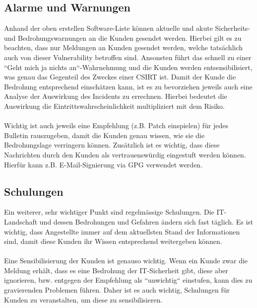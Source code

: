 \subsection{Alarme und Warnungen}
Anhand der oben erstellen Software-Liste können aktuelle und akute Sicherheits- und Bedrohungswarnungen an die Kunden gesendet werden. Hierbei gilt es zu beachten, dass nur Meldungen an Kunden gesendet werden, welche tatsächlich auch von dieser Vulnerability betroffen sind. Ansonsten führt das schnell zu einer ``Geht mich ja nichts an``-Wahrnehmung und die Kunden werden entsensibilisiert, was genau das Gegenteil des Zweckes einer CSIRT ist. Damit der Kunde die Bedrohung entsprechend einschätzen kann, ist es zu bevorziehen jeweils auch eine Analyse der Auswirkung des Incidents zu errechnen. Hierbei bedeutet die Auswirkung die Eintrittswahrscheinlichkeit multipliziert mit dem Risiko. \\
\\
Wichtig ist auch jeweils eine Empfehlung (z.B. Patch einspielen) für jedes Bulletin rauszugeben, damit die Kunden genau wissen, wie sie die Bedrohungslage verringern können. Zusätzlich ist es wichtig, dass diese Nachrichten durch den Kunden als vertrauenswürdig eingestuft werden können. Hierfür kann z.B. E-Mail-Signierung via GPG verwendet werden.

\subsection{Schulungen}
Ein weiterer, sehr wichtiger Punkt sind regelmässige Schulungen. Die IT-Landschaft und dessen Bedrohungen und Gefahren ändern sich fast täglich. Es ist wichtig, dass Angestellte immer auf dem aktuellsten Stand der Informationen sind, damit diese Kunden ihr Wissen entsprechend weitergeben können.\\
\\
Eine Sensibilisierung der Kunden ist genauso wichtig. Wenn ein Kunde zwar die Meldung erhält, dass es eine Bedrohung der IT-Sicherheit gibt, diese aber ignorieren, bzw. entgegen der Empfehlung als ``unwichtig`` einstufen, kann dies zu gravierenden Problemen führen. Daher ist es auch wichtig, Schulungen für Kunden zu veranstalten, um diese zu sensibilisieren.

